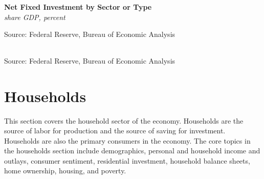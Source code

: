 \documentclass{report}
\makeatletter
\newcommand{\tbllink}[1]{\href{https://raw.githubusercontent.com/bdecon/US-chartbook/master/chartbook/data/#1}{\faTable}}
\newcommand*\short[1]{\expandafter\@gobbletwo\number\numexpr#1\relax}
\newcommand{\sbar}[4]{
		\addplot[ybar stacked, bar width=2.3pt, draw opacity=0, fill=#1] 
			table [x=#2, y=#3, col sep=comma]{#4};}
\newcommand{\dateaxisticks}{
		date coordinates in=x, axis line style={draw=none},
		xmax={2023-10-01},
		max space between ticks=40,	    
		xtick={{1990-01-01}, {1992-01-01}, {1994-01-01}, 
			{1996-01-01}, {1998-01-01}, {2000-01-01}, 
			{2002-01-01}, {2004-01-01}, {2006-01-01},
			{2008-01-01}, {2010-01-01}, {2012-01-01}, {2014-01-01},
		    {2016-01-01}, {2018-01-01}, {2020-01-01}, {2022-01-01}, 
		    {2024-01-01}, {2026-01-01}},
		minor xtick={{1989-01-01}, {1991-01-01}, {1993-01-01},
			{1995-01-01}, {1997-01-01}, {1999-01-01}, 
			{2001-01-01}, {2003-01-01}, {2005-01-01}, {2007-01-01},
		    {2009-01-01}, {2011-01-01}, {2013-01-01}, {2015-01-01},
		    {2017-01-01}, {2019-01-01}, {2021-01-01}, {2023-01-01}, 
		    {2025-01-01}, {2027-01-01}},
		enlarge y limits={0.06}, enlarge x limits={0.01},
		}
\newcommand{\bbar}[2]{extra #1 ticks = {{#2}}, extra #1 tick labels = ,
		extra #1 tick style = {grid=major, grid style={thick, black!25}},}
\newcommand{\rbars}{
		\fill[color=black!10] (axis cs:{1990-07-01},\pgfkeysvalueof{/pgfplots/ymin}) rectangle 
			(axis cs:{1991-03-01}, \pgfkeysvalueof{/pgfplots/ymax});
		\fill[color=black!10] (axis cs:{2007-12-01},\pgfkeysvalueof{/pgfplots/ymin}) rectangle 
			(axis cs:{2009-07-01}, \pgfkeysvalueof{/pgfplots/ymax});
		\fill[color=black!10] (axis cs:{2001-03-01},\pgfkeysvalueof{/pgfplots/ymin}) rectangle 
			(axis cs:{2001-11-01}, \pgfkeysvalueof{/pgfplots/ymax});
		\fill[color=black!10] (axis cs:{2020-02-01},\pgfkeysvalueof{/pgfplots/ymin}) rectangle 
			(axis cs:{2020-05-01}, \pgfkeysvalueof{/pgfplots/ymax});}
\makeatother
\begin{document}
{\begin{minipage}{0.76\textwidth}
\small 
\vspace{0.5mm}

\normalsize \textbf{Net Fixed Investment by Sector or Type}\\
\footnotesize{\textit{share GDP, percent}}
\vspace{2.2cm}

\hspace{2mm} 

\footnotesize{Source: Federal Reserve, Bureau of Economic Analysis} \hfill \tbllink{z1_nfi.csv}

 \setlength{\tabcolsep}{3.5pt} \color{black!90}
		{\renewcommand{\arraystretch}{1.54}
		 \begin{tabular}{p{42mm} R{7.8mm} R{7.8mm} R{7.8mm} R{7.8mm} 
		   R{8.2mm} R{8.2mm} R{8.2mm} }
			  \hline
		\end{tabular}}	\vspace{-2mm}
		
\footnotesize{Source: Federal Reserve, Bureau of Economic Analysis}
\end{minipage}
\newpage
\hypertarget{hh}{\label{hh}}
\section*{Households} 
\begin{minipage}{0.76\textwidth}
\small This section covers the household sector of the economy. Households are the source of labor for production and the source of saving for investment. Households are also the primary consumers in the economy. The core topics in the households section include demographics, personal and household income and outlays, consumer sentiment, residential investment, household balance sheets, home ownership, housing, and poverty.


\end{minipage}}
\end{document}
